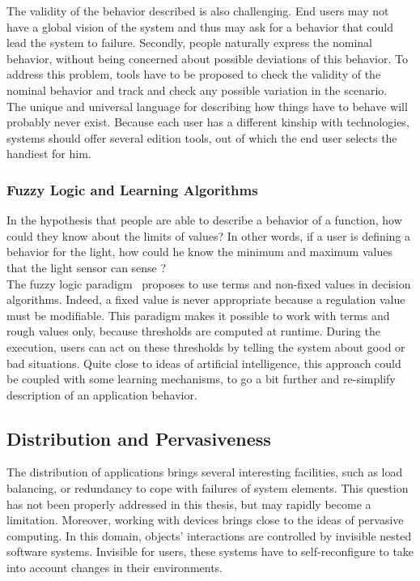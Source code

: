 The validity of the behavior described is also challenging. End users may not have a global vision of the system and thus may ask for a behavior that could lead the system to failure. Secondly, people naturally express the nominal behavior, without being concerned about possible deviations of this behavior. To address this problem, tools have to be proposed to check the validity of the nominal behavior and track and check any possible variation in the scenario.\\

The unique and universal language for describing how things have to behave will probably never exist. Because each user has a different kinship with technologies, systems should offer several edition tools, out of which the end user selects the handiest for him.


\subsubsection{Fuzzy Logic and Learning Algorithms}

In the hypothesis that people are able to describe a behavior of a function, how could they know about the limits of values? In other words, if a user is defining a behavior for the light, how could he know the minimum and maximum values that the light sensor can sense ?\\
The fuzzy logic paradigm~\cite{Chauvel:2008,Mendel:2001} proposes to use terms and non-fixed values in decision algorithms. Indeed, a fixed value is never appropriate because a regulation value must be modifiable. This paradigm makes it possible to work with terms and rough values only, because thresholds are computed at runtime. During the execution, users can act on these thresholds by telling the system about good or bad situations. Quite close to ideas of artificial intelligence, this approach could be coupled with some learning mechanisms, to go a bit further and re-simplify description of an application behavior.

\subsection{Distribution and Pervasiveness}

The distribution of applications brings several interesting facilities, such as load balancing, or redundancy to cope with failures of system elements. This question has not been properly addressed in this thesis, but may rapidly become a limitation. Moreover, working with devices brings \enti{} close to the ideas of pervasive computing. In this domain, objects' interactions are controlled by invisible nested software systems. Invisible for users, these systems have to self-reconfigure to take into account changes in their environments.\\

